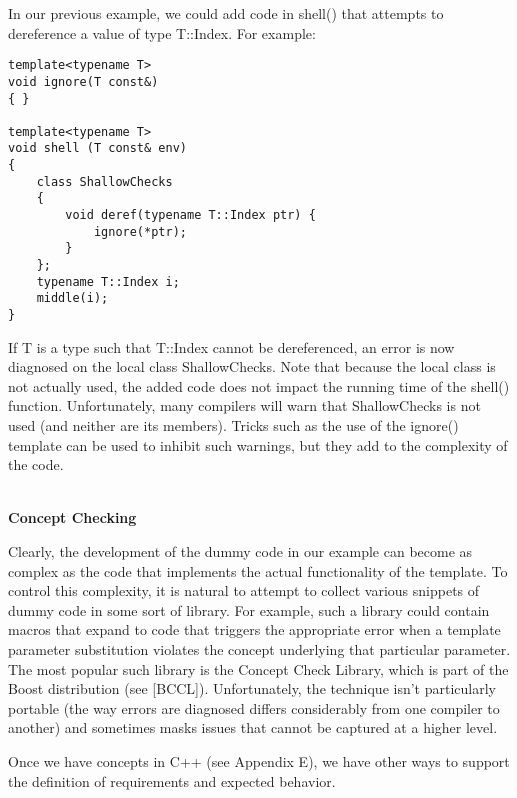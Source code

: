 In our previous example, we could add code in shell() that attempts to dereference a value of type T::Index. For example:

\begin{lstlisting}[style=styleCXX]
template<typename T>
void ignore(T const&)
{ }

template<typename T>
void shell (T const& env)
{
	class ShallowChecks
	{
		void deref(typename T::Index ptr) {
			ignore(*ptr);
		}
	};
	typename T::Index i;
	middle(i);
}
\end{lstlisting}

If T is a type such that T::Index cannot be dereferenced, an error is now diagnosed on the local class ShallowChecks. Note that because the local class is not actually used, the added code does not impact the running time of the shell() function. Unfortunately, many compilers will warn that ShallowChecks is not used (and neither are its members). Tricks such as the use of the ignore() template can be used to inhibit such warnings, but they add to the complexity of the code.

\hspace*{\fill} \\ %
\noindent
\textbf{Concept Checking}

Clearly, the development of the dummy code in our example can become as complex as the code that implements the actual functionality of the template. To control this complexity, it is natural to attempt to collect various snippets of dummy code in some sort of library. For example, such a library could contain macros that expand to code that triggers the appropriate error when a template parameter substitution violates the concept underlying that particular parameter. The most popular such library is the Concept Check Library, which is part of the Boost distribution (see [BCCL]). Unfortunately, the technique isn’t particularly portable (the way errors are diagnosed differs considerably from one compiler to another) and sometimes masks issues that cannot be captured at a higher level.

Once we have concepts in C++ (see Appendix E), we have other ways to support the definition of requirements and expected behavior.






























